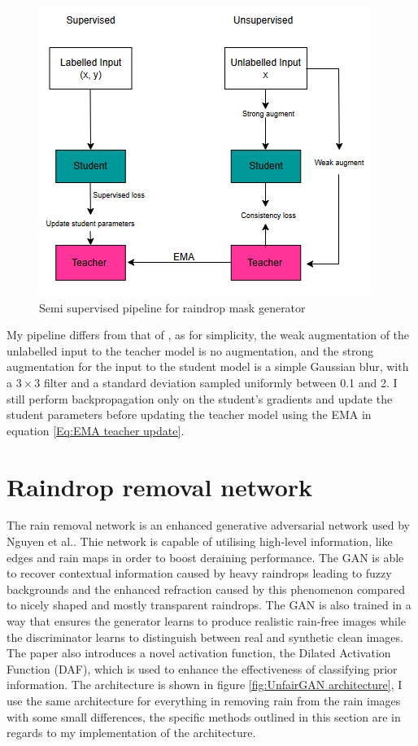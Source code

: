 \documentclass[11pt]{ociamthesis}  %
\begin{document}
\begin{figure}
    \centering
    \includegraphics[width=0.5\linewidth]{figures/Uncertainty Guide Pipeline.png}
    \caption{Semi supervised pipeline for raindrop mask generator}
    \label{fig:Semi supervised pipeline}
\end{figure}

My pipeline differs from that of \cite{Perone_2018}, as for simplicity, the weak augmentation of the unlabelled input to the teacher model is no augmentation, and the strong augmentation for the input to the student model is a simple Gaussian blur, with a $3 \times 3$ filter and a standard deviation sampled uniformly between 0.1 and 2. I still perform backpropagation only on the student's gradients and update the student parameters before updating the teacher model using the EMA in equation \ref{Eq:EMA teacher update}. 

\section{Raindrop removal network}
The rain removal network is an enhanced generative adversarial network used by Nguyen et al.\cite{NGUYEN2022118232}. Thie network is capable of utilising high-level information, like edges and rain maps in order to boost deraining performance. The GAN is able to recover contextual information caused by heavy raindrops leading to fuzzy backgrounds and the enhanced refraction caused by this phenomenon compared to nicely shaped and mostly transparent raindrops. The GAN is also trained in a way that ensures the generator learns to produce realistic rain-free images while the discriminator learns to distinguish between real and synthetic clean images. The paper also introduces a novel activation function, the Dilated Activation Function (DAF), which is used to enhance the effectiveness of classifying prior information. The architecture is shown in figure \ref{fig:UnfairGAN architecture}, I use the same architecture for everything in removing rain from the rain images with some small differences, the specific methods outlined in this section are in regards to my implementation of the architecture.
\end{document}
